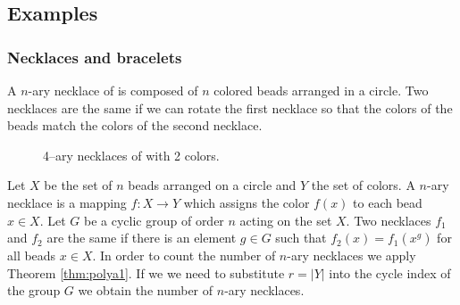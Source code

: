 \documentclass[11pt]{article}
\begin{document}
\subsection{Examples}

\subsubsection{Necklaces and bracelets}

A $n$-ary necklace of is composed of $n$ colored beads arranged in a
circle. Two necklaces are the same if we can rotate the first necklace
so that the colors of the beads match the colors of the second
necklace.

\begin{figure}
\begin{center}
\end{center}
\caption{4--ary necklaces of with 2 colors.}
\label{fig:necklaces2}
\end{figure}

Let $X$ be the set of $n$ beads arranged on a circle and $Y$ the set
of colors. A $n$-ary necklace is a mapping $f:X\to Y$ which assigns
the color $f(x)$ to each bead $x\in X$. Let $G$ be a cyclic group of
order $n$ acting on the set $X$. Two necklaces $f_1$ and $f_2$ are the
same if there is an element $g\in G$ such that $f_2(x)=f_1(x^g)$ for
all beads $x\in X$. In order to count the number of $n$-ary necklaces
we apply Theorem \ref{thm:polya1}. If we we need to substitute $r=|Y|$
into the cycle index of the group $G$ we obtain the number of $n$-ary
necklaces.
\end{document}
